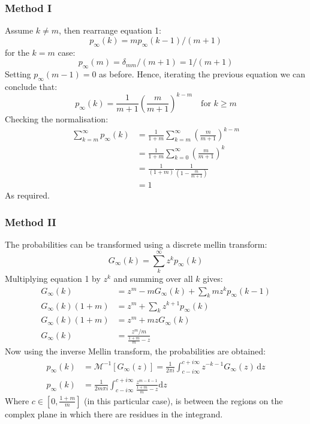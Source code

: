 \documentclass[twoside]{article}
\begin{document}
\subsubsection{Method I}
Assume $k \neq m$, then rearrange equation 1:
\[
p_{\infty} (k) =mp_{\infty} (k-1) / (m+1)
\]
for the $k=m$ case:
\[
p_{\infty} (m)= \delta_{mm}/(m+1)=1/(m+1)
\]
Setting $p_{\infty} (m-1)=0$ as before. Hence, iterating the previous equation we can conclude that:
\[
\boxed{
p_{\infty}(k) =\frac{1}{m+1} \left( \frac{m}{m+1} \right)^{k-m}  \quad \text{for } k \geq m}
\]
Checking the normalisation:
\begin{align*}
\sum_{k=m}^{\infty} p_{\infty} (k) &= \frac{1}{1+m} \sum_{k=m}^{\infty} \left( \frac{m}{m+1} \right)^{k-m} \\
&=  \frac{1}{1+m}  \sum_{k=0}^{\infty} \left( \frac{m}{m+1} \right)^{k} \\
&= \frac{1}{(1+m)} \frac{1}{(1-\frac{m}{m+1})} \\
&= 1
\end{align*}
As required.
\subsubsection{Method II}

The probabilities can be transformed using a discrete mellin transform:\cite{cc}
\[
G_{\infty} (k) = \sum_k^{\infty} z^k p_{\infty} (k)
\]
Multiplying equation 1 by $z^k$ and summing over all $k$ gives:
\begin{align*}
G_{\infty} (k) &= z^m -mG_{\infty} (k) + \sum_{k} m z^k p_{\infty}(k-1) \\
G_{\infty} (k)(1+m) &= z^m+ \sum_k z^{k+1} p_{\infty} (k) \\
G_{\infty} (k)(1+m) &= z^m + mz G_{\infty} (k)\\
G_{\infty}(k) & = \frac{z^m/m}{\frac{1+m}{m}-z}
\end{align*}
Now using the inverse Mellin transform, the probabilities are obtained:
\begin{align*}
p_{\infty} (k) &= \mathcal{M}^{-1} [G_{\infty}(z)] = \frac{1}{2\pi i} \int_{c-i\infty}^{c+i\infty} z^{-k-1} G_{\infty}(z)\, \mathrm{d} z \\
p_{\infty} (k) &=  \frac{1}{2m\pi i} \int_{c-i\infty}^{c+i\infty}  \frac{z^{m-k-1}}{\frac{1+m}{m}-z} \mathrm{d} z 
\end{align*}
Where $c \in [0,\frac{1+m}{m}]$ (in this particular case), is between the regions on the complex plane in which there are residues in the integrand.
\end{document}
